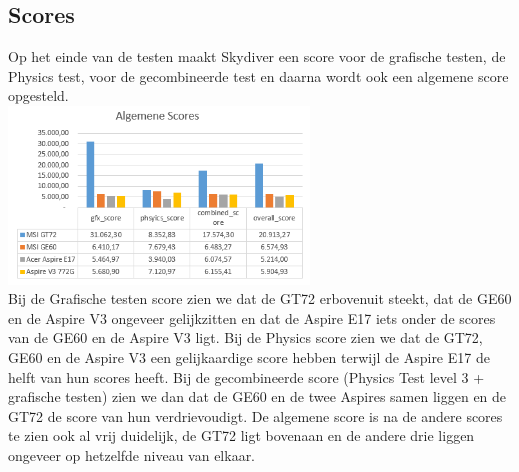 \subsection{Scores}
Op het einde  van de testen maakt Skydiver een score voor de grafische testen, de Physics test, voor de gecombineerde test en daarna wordt ook een algemene score opgesteld. \\
\includegraphics[width=8cm]{algemeen}\\
Bij de Grafische testen score zien we dat de GT72 erbovenuit steekt, dat de GE60 en de Aspire V3 ongeveer gelijkzitten en dat de Aspire E17 iets onder de scores van de GE60 en de Aspire V3 ligt.
Bij de Physics score zien we dat de GT72, GE60 en de Aspire V3 een gelijkaardige score hebben terwijl de Aspire E17 de helft van hun scores heeft.
Bij de gecombineerde score (Physics Test level 3 + grafische testen) zien we dan dat de GE60 en de twee Aspires samen liggen en de GT72 de score van hun verdrievoudigt.
De algemene score is na de andere scores te zien ook al vrij duidelijk, de GT72 ligt bovenaan en de andere drie liggen ongeveer op hetzelfde niveau van elkaar.
